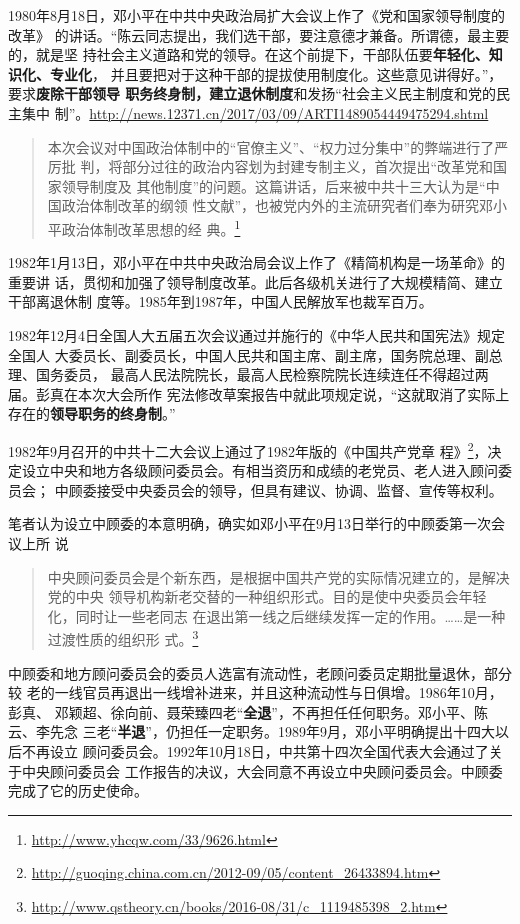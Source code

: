 1980年8月18日，邓小平在中共中央政治局扩大会议上作了《党和国家领导制度的改革》
的讲话。“陈云同志提出，我们选干部，要注意德才兼备。所谓德，最主要的，就是坚
持社会主义道路和党的领导。在这个前提下，干部队伍要\textbf{年轻化、知识化、专业化}，
并且要把对于这种干部的提拔使用制度化。这些意见讲得好。”，要求\textbf{废除干部领导
  职务终身制，建立退休制度}和发扬“社会主义民主制度和党的民主集中
制”。\url{http://news.12371.cn/2017/03/09/ARTI1489054449475294.shtml}
\begin{quotation}
  本次会议对中国政治体制中的“官僚主义”、“权力过分集中”的弊端进行了严厉批
  判，将部分过往的政治内容划为封建专制主义，首次提出“改革党和国家领导制度及
  其他制度”的问题。这篇讲话，后来被中共十三大认为是“中国政治体制改革的纲领
  性文献”，也被党内外的主流研究者们奉为研究邓小平政治体制改革思想的经
  典。\footnote{\url{http://www.yhcqw.com/33/9626.html}}
\end{quotation}

1982年1月13日，邓小平在中共中央政治局会议上作了《精简机构是一场革命》的重要讲
话，贯彻和加强了领导制度改革。此后各级机关进行了大规模精简、建立干部离退休制
度等。1985年到1987年，中国人民解放军也裁军百万。

1982年12月4日全国人大五届五次会议通过并施行的《中华人民共和国宪法》规定全国人
大委员长、副委员长，中国人民共和国主席、副主席，国务院总理、副总理、国务委员，
最高人民法院院长，最高人民检察院院长连续连任不得超过两届。彭真在本次大会所作
宪法修改草案报告中就此项规定说，“这就取消了实际上存在的\textbf{领导职务的终身制}。”


1982年9月召开的中共十二大会议上通过了1982年版的《中国共产党章
程》\footnote{\url{http://guoqing.china.com.cn/2012-09/05/content_26433894.htm}}，决
定设立中央和地方各级顾问委员会。有相当资历和成绩的老党员、老人进入顾问委员会；
中顾委接受中央委员会的领导，但具有建议、协调、监督、宣传等权利。

笔者认为设立中顾委的本意明确，确实如邓小平在9月13日举行的中顾委第一次会议上所
说
\begin{quotation}
  中央顾问委员会是个新东西，是根据中国共产党的实际情况建立的，是解决党的中央
  领导机构新老交替的一种组织形式。目的是使中央委员会年轻化，同时让一些老同志
  在退出第一线之后继续发挥一定的作用。……是一种过渡性质的组织形
  式。\footnote{\url{http://www.qstheory.cn/books/2016-08/31/c_1119485398_2.htm}}
\end{quotation}

中顾委和地方顾问委员会的委员人选富有流动性，老顾问委员定期批量退休，部分较
老的一线官员再退出一线增补进来，并且这种流动性与日俱增。1986年10月，彭真、
邓颖超、徐向前、聂荣臻四老“\textbf{全退}”，不再担任任何职务。邓小平、陈云、李先念
三老“\textbf{半退}”，仍担任一定职务。1989年9月，邓小平明确提出十四大以后不再设立
顾问委员会。1992年10月18日，中共第十四次全国代表大会通过了关于中央顾问委员会
工作报告的决议，大会同意不再设立中央顾问委员会。中顾委完成了它的历史使命。

